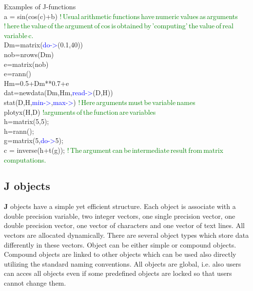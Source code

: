 \begin{example}[jfuncex]Examples of J-functions\\
\label{jfuncex}
a = \textcolor{VioletRed}{sin}(\textcolor{VioletRed}{cos}(c)+b) \textcolor{green}{!\,Usual\,arithmetic\,functions\,have\,numeric\,values\,as\,arguments}\\
\textcolor{green}{!\,here\,the\,value\,of\,the\,argument\,of\,cos\,is\,obtained\,by\,'computing'\,the\,value\,of\,real\,variable\,c.}\\
Dm=\textcolor{VioletRed}{matrix}(\textcolor{blue}{do->}(0.1,40))\\
nob=\textcolor{VioletRed}{nrows}(Dm)\\
e=\textcolor{VioletRed}{matrix}(nob)\\
e=\textcolor{VioletRed}{rann}()\\
Hm=0.5+Dm**0.7+e\\
dat=\textcolor{VioletRed}{newdata}(Dm,Hm,\textcolor{blue}{read->}(D,H))\\
\textcolor{VioletRed}{stat}(D,H,\textcolor{blue}{min->},\textcolor{blue}{max->}) \textcolor{green}{!\,Here\,arguments\,must\,be\,variable\,names}\\
\textcolor{VioletRed}{plotyx}(H,D) \textcolor{green}{!arguments\,of\,the\,function\,are\,variables}\\
h=\textcolor{VioletRed}{matrix}(5,5);\\
h=\textcolor{VioletRed}{rann}();\\
g=\textcolor{VioletRed}{matrix}(5,\textcolor{blue}{do->}5);\\
c = \textcolor{VioletRed}{inverse}(h+\textcolor{VioletRed}{t}(g)); \textcolor{green}{!\,The\,argument\,can\,be\,intermediate\,result\,from\,matrix\,computations.}
\end{example}
\subsection{\textbf{J} objects}
\label{objintro}
\textbf{J} objects have a simple yet efficient structure. Each object is associate with a double precision
variable, two integer vectors, one single precision vector, one double precision vector,
one vector of characters and one vector of text lines. All vectors are allocated dynamically.
There are several object types which store data differently in these vectors.
Object can be either simple or compound objects. Compound objects are linked to other
objects which can be used also directly utilizing the standard naming conventions. All objects are
global, i.e. also users can acces all objects even if some predefined objects are locked so that
users cannot change them.
